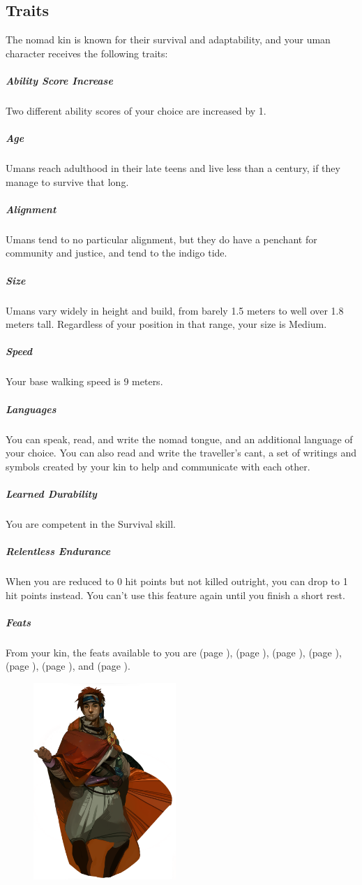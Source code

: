 \subsection*{Traits}
    The nomad kin is known for their survival and adaptability, and your uman character receives the following traits:

    \subparagraph{Ability Score Increase} Two different ability scores of your choice are increased by 1.

    \subparagraph{Age} Umans reach adulthood in their late teens and live less than a century, if they manage to survive that long.

    \subparagraph{Alignment} Umans tend to no particular alignment, but they do have a penchant for community and justice, and tend to the indigo tide.

    \subparagraph{Size} Umans vary widely in height and build, from barely 1.5 meters to well over 1.8 meters tall.
    Regardless of your position in that range, your size is Medium.

    \subparagraph{Speed} Your base walking speed is 9 meters.

    \subparagraph{Languages} You can speak, read, and write the nomad tongue, and an additional language of your choice.
    You can also read and write the traveller's cant, a set of writings and symbols created by your kin to help and communicate with each other.

    \subparagraph{Learned Durability} You are competent in the Survival skill.

    \subparagraph{Relentless Endurance} When you are reduced to 0 hit points but not killed outright, you can drop to 1 hit points instead.
    You can't use this feature again until you finish a short rest.

    \subparagraph{Feats} From your kin, the feats available to you are
    \textbf{} (page \pageref{feat::}),
    \textbf{} (page \pageref{feat::}),
    \textbf{} (page \pageref{feat::}),
    \textbf{} (page \pageref{feat::}),
    \textbf{} (page \pageref{feat::}),
    \textbf{} (page \pageref{feat::}), and
    \textbf{} (page \pageref{feat::}).

\begin{figure}[!t]
    \centering
    \includegraphics[width=0.48\textwidth]{04kins/img/19uman_nomad.png}
\end{figure}

